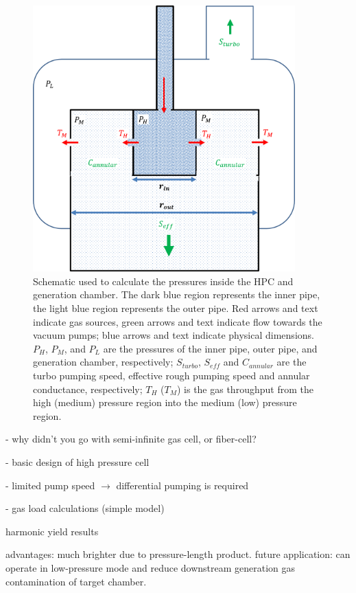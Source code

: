 \begin{figure}
	\centering
	\includegraphics[width=0.9\textwidth]{figures/chap2/HPC_pressure_schematic.png}
	\caption{Schematic used to calculate the pressures inside the HPC and generation chamber. The dark blue region represents the inner pipe, the light blue region represents the outer pipe. Red arrows and text indicate gas sources, green arrows and text indicate flow towards the vacuum pumps; blue arrows and text indicate physical dimensions. $P_H$, $P_M$, and $P_L$ are the pressures of the inner pipe, outer pipe, and generation chamber, respectively; $S_{turbo}$, $S_{eff}$ and $C_{annular}$ are the turbo pumping speed, effective rough pumping speed and annular conductance, respectively; $T_H$ ($T_M$) is the gas throughput from the high (medium) pressure region into the medium (low) pressure region.}
	\label{fig:HPC_pressure_schematic}
\end{figure}

- why didn't you go with semi-infinite gas cell, or fiber-cell?

- basic design of high pressure cell

- limited pump speed $\rightarrow$ differential pumping is required

- gas load calculations (simple model)

harmonic yield results

advantages: much brighter due to pressure-length product. future application: can operate in low-pressure mode and reduce downstream generation gas contamination of target chamber.

